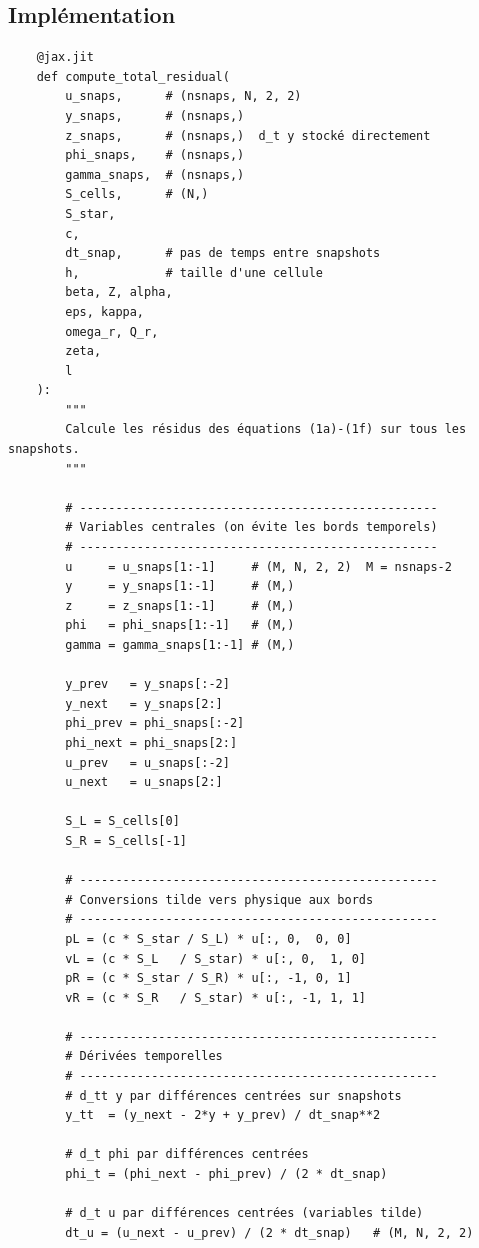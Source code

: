\documentclass[12pt,a4paper]{article}
\begin{document}
\newpage
\subsection{Implémentation}

\begin{verbatim}
    @jax.jit
    def compute_total_residual(
        u_snaps,      # (nsnaps, N, 2, 2)
        y_snaps,      # (nsnaps,)
        z_snaps,      # (nsnaps,)  d_t y stocké directement
        phi_snaps,    # (nsnaps,)
        gamma_snaps,  # (nsnaps,)
        S_cells,      # (N,)
        S_star,
        c,
        dt_snap,      # pas de temps entre snapshots
        h,            # taille d'une cellule
        beta, Z, alpha,
        eps, kappa,
        omega_r, Q_r,
        zeta,
        l
    ):
        """
        Calcule les résidus des équations (1a)-(1f) sur tous les snapshots.
        """

        # --------------------------------------------------
        # Variables centrales (on évite les bords temporels)
        # --------------------------------------------------
        u     = u_snaps[1:-1]     # (M, N, 2, 2)  M = nsnaps-2
        y     = y_snaps[1:-1]     # (M,)
        z     = z_snaps[1:-1]     # (M,)
        phi   = phi_snaps[1:-1]   # (M,)
        gamma = gamma_snaps[1:-1] # (M,)

        y_prev   = y_snaps[:-2]
        y_next   = y_snaps[2:]
        phi_prev = phi_snaps[:-2]
        phi_next = phi_snaps[2:]
        u_prev   = u_snaps[:-2]
        u_next   = u_snaps[2:]

        S_L = S_cells[0]
        S_R = S_cells[-1]

        # --------------------------------------------------
        # Conversions tilde vers physique aux bords
        # --------------------------------------------------
        pL = (c * S_star / S_L) * u[:, 0,  0, 0]   
        vL = (c * S_L   / S_star) * u[:, 0,  1, 0] 
        pR = (c * S_star / S_R) * u[:, -1, 0, 1]    
        vR = (c * S_R   / S_star) * u[:, -1, 1, 1]  

        # --------------------------------------------------
        # Dérivées temporelles
        # --------------------------------------------------
        # d_tt y par différences centrées sur snapshots
        y_tt  = (y_next - 2*y + y_prev) / dt_snap**2

        # d_t phi par différences centrées
        phi_t = (phi_next - phi_prev) / (2 * dt_snap)

        # d_t u par différences centrées (variables tilde)
        dt_u = (u_next - u_prev) / (2 * dt_snap)   # (M, N, 2, 2)


\end{verbatim}
\end{document}

